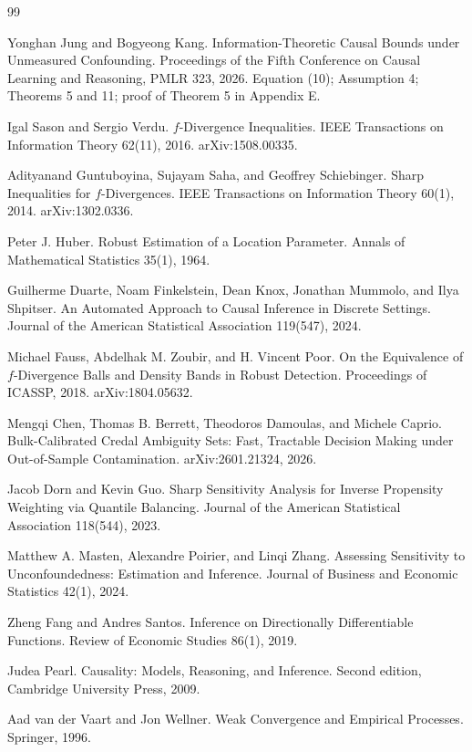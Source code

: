 \documentclass{article}
\begin{document}
\begin{thebibliography}{99}

   Yonghan Jung and Bogyeong Kang. Information-Theoretic Causal Bounds under Unmeasured Confounding. Proceedings of the Fifth Conference on Causal Learning and Reasoning, PMLR 323, 2026. Equation (10); Assumption 4; Theorems 5 and 11; proof of Theorem 5 in Appendix E.

   Igal Sason and Sergio Verdu. \(f\)-Divergence Inequalities. IEEE Transactions on Information Theory 62(11), 2016. arXiv:1508.00335.

   Adityanand Guntuboyina, Sujayam Saha, and Geoffrey Schiebinger. Sharp Inequalities for \(f\)-Divergences. IEEE Transactions on Information Theory 60(1), 2014. arXiv:1302.0336.

   Peter J. Huber. Robust Estimation of a Location Parameter. Annals of Mathematical Statistics 35(1), 1964.

   Guilherme Duarte, Noam Finkelstein, Dean Knox, Jonathan Mummolo, and Ilya Shpitser. An Automated Approach to Causal Inference in Discrete Settings. Journal of the American Statistical Association 119(547), 2024.

   Michael Fauss, Abdelhak M. Zoubir, and H. Vincent Poor. On the Equivalence of \(f\)-Divergence Balls and Density Bands in Robust Detection. Proceedings of ICASSP, 2018. arXiv:1804.05632.

   Mengqi Chen, Thomas B. Berrett, Theodoros Damoulas, and Michele Caprio. Bulk-Calibrated Credal Ambiguity Sets: Fast, Tractable Decision Making under Out-of-Sample Contamination. arXiv:2601.21324, 2026.

   Jacob Dorn and Kevin Guo. Sharp Sensitivity Analysis for Inverse Propensity Weighting via Quantile Balancing. Journal of the American Statistical Association 118(544), 2023.

   Matthew A. Masten, Alexandre Poirier, and Linqi Zhang. Assessing Sensitivity to Unconfoundedness: Estimation and Inference. Journal of Business and Economic Statistics 42(1), 2024.

   Zheng Fang and Andres Santos. Inference on Directionally Differentiable Functions. Review of Economic Studies 86(1), 2019.

   Judea Pearl. Causality: Models, Reasoning, and Inference. Second edition, Cambridge University Press, 2009.

   Aad van der Vaart and Jon Wellner. Weak Convergence and Empirical Processes. Springer, 1996.

\end{thebibliography}
\end{document}
